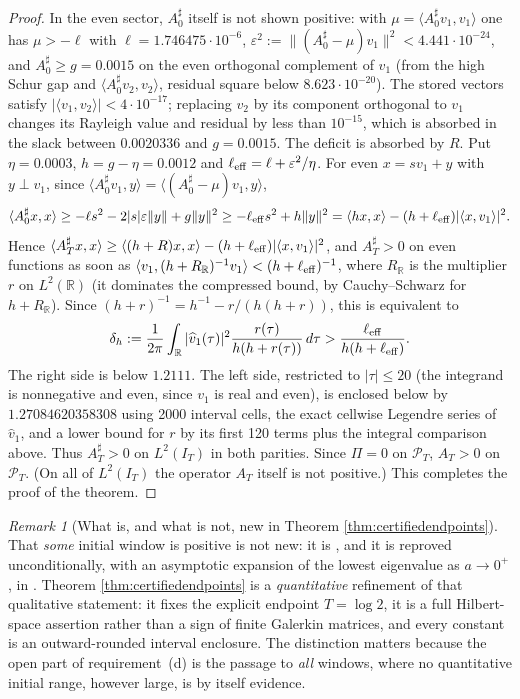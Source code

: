 \documentclass[11pt]{amsart}
\theoremstyle{definition}
\theoremstyle{remark}
\newtheorem{remark}[theorem]{Remark}
\newcommand{\R}{\mathbb R}
\begin{document}
\begin{proof}
In the even sector, \(A_0^\sharp\) itself is not shown positive: with
\(\mu=\langle A_0^\sharp v_1,v_1\rangle\) one has \(\mu>-\ell\) with
\(\ell=1.746475\cdot10^{-6}\),
\(\varepsilon^2:=\|(A_0^\sharp-\mu)v_1\|^2<4.441\cdot10^{-24}\), and
\(A_0^\sharp\ge g=0.0015\) on the even orthogonal complement of \(v_1\) (from
the high Schur gap and \(\langle A_0^\sharp v_2,v_2\rangle\), residual square
below \(8.623\cdot10^{-20}\)).  The stored vectors satisfy
\(|\langle v_1,v_2\rangle|<4\cdot10^{-17}\); replacing \(v_2\) by its
component orthogonal to \(v_1\) changes its Rayleigh value and residual by
less than \(10^{-15}\), which is absorbed in the slack between
\(0.0020336\) and \(g=0.0015\).  The deficit is absorbed by \(R\).  Put
\(\eta=0.0003\), \(h=g-\eta=0.0012\) and
\(\ell_{\rm eff}=\ell+\varepsilon^2/\eta\).  For even \(x=sv_1+y\) with
\(y\perp v_1\), since \(\langle A_0^\sharp v_1,y\rangle=\langle(A_0^\sharp-\mu)v_1,y\rangle\),
\[
 \langle A_0^\sharp x,x\rangle\ge-\ell s^2-2|s|\varepsilon\|y\|+g\|y\|^2
 \ge-\ell_{\rm eff}s^2+h\|y\|^2
 =\langle hx,x\rangle-(h+\ell_{\rm eff})|\langle x,v_1\rangle|^2 .
\]
Hence \(\langle A_T^\sharp x,x\rangle\ge\langle(h+R)x,x\rangle-(h+\ell_{\rm eff})
|\langle x,v_1\rangle|^2\), and \(A_T^\sharp>0\) on even functions as soon as
\(\langle v_1,(h+R_{\mathbb R})^{-1}v_1\rangle<(h+\ell_{\rm eff})^{-1}\),
where \(R_{\mathbb R}\) is the multiplier \(r\) on \(L^2(\R)\) (it dominates
the compressed bound, by Cauchy--Schwarz for \(h+R_{\mathbb R}\)).  Since
\((h+r)^{-1}=h^{-1}-r/(h(h+r))\), this is equivalent to
\[
 \delta_h:=\frac1{2\pi}\int_{\R}|\widehat v_1(\tau)|^2
 \frac{r(\tau)}{h(h+r(\tau))}\,d\tau
 >\frac{\ell_{\rm eff}}{h(h+\ell_{\rm eff})}.
\]
The right side is below \(1.2111\).  The left side, restricted to
\(|\tau|\le20\) (the integrand is nonnegative and even, since \(v_1\) is
real and even), is enclosed below by \(1.27084620358308\) using 2000
interval cells, the exact cellwise Legendre series of \(\widehat v_1\), and a
lower bound for \(r\) by its first 120 terms plus the integral comparison
above.  Thus \(A_T^\sharp>0\) on \(L^2(I_T)\) in both parities.  Since
\(\Pi=0\) on \(\mathcal P_T\), \(A_T>0\) on \(\mathcal P_T\).  (On all of
\(L^2(I_T)\) the operator \(A_T\) itself is not positive.)  This completes the proof of the theorem.
\end{proof}

\begin{remark}[What is, and what is not, new in Theorem
\ref{thm:certifiedendpoints}]
\label{rem:yoshidacalibration}
That \emph{some} initial window is positive is not new: it is
\cite[Lemma~2]{Yoshida1992}, and it is reproved unconditionally, with an
asymptotic expansion of the lowest eigenvalue as \(a\to0^+\), in
\cite[Theorem~1.4]{SuzukiScrew}.  Theorem \ref{thm:certifiedendpoints} is a
\emph{quantitative} refinement of that qualitative statement: it fixes the
explicit endpoint \(T=\log2\), it is a full Hilbert-space assertion rather
than a sign of finite Galerkin matrices, and every constant is an
outward-rounded interval enclosure.  The distinction matters because the
open part of requirement~(d) is the passage to \emph{all} windows, where no
quantitative initial range, however large, is by itself evidence.
\end{remark}
\end{document}
